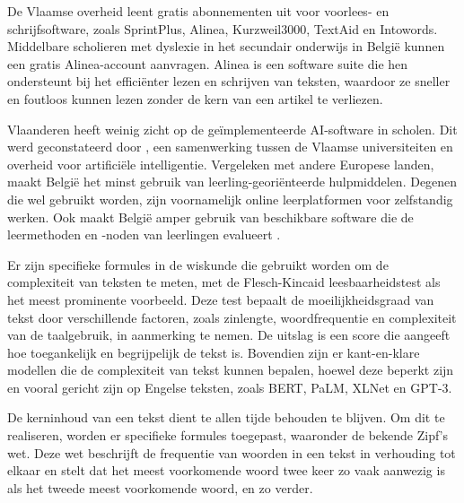 De Vlaamse overheid leent gratis abonnementen uit voor voorlees- en schrijfsoftware, zoals SprintPlus, Alinea, Kurzweil3000, TextAid en Intowords. Middelbare scholieren met dyslexie in het secundair onderwijs in België kunnen een gratis Alinea-account aanvragen. Alinea is een software suite die hen ondersteunt bij het efficiënter lezen en schrijven van teksten, waardoor ze sneller en foutloos kunnen lezen zonder de kern van een artikel te verliezen. 

Vlaanderen heeft weinig zicht op de geïmplementeerde AI-software in scholen. Dit werd geconstateerd door \autocite{Martens2021}, een samenwerking tussen de Vlaamse universiteiten en overheid voor artificiële intelligentie. Vergeleken met andere Europese landen, maakt België het minst gebruik van leerling-georiënteerde hulpmiddelen. Degenen die wel gebruikt worden, zijn voornamelijk online leerplatformen voor zelfstandig werken. Ook maakt België amper gebruik van beschikbare software die de leermethoden en -noden van leerlingen evalueert \autocite{Martens2021a}. 




Er zijn specifieke formules in de wiskunde die gebruikt worden om de complexiteit van teksten te meten, met de Flesch-Kincaid leesbaarheidstest als het meest prominente voorbeeld. Deze test bepaalt de moeilijkheidsgraad van tekst door verschillende factoren, zoals zinlengte, woordfrequentie en complexiteit van de taalgebruik, in aanmerking te nemen. De uitslag is een score die aangeeft hoe toegankelijk en begrijpelijk de tekst is. Bovendien zijn er kant-en-klare modellen die de complexiteit van tekst kunnen bepalen, hoewel deze beperkt zijn en vooral gericht zijn op Engelse teksten, zoals BERT, PaLM, XLNet en GPT-3.

De kerninhoud van een tekst dient te allen tijde behouden te blijven. Om dit te realiseren, worden er specifieke formules toegepast, waaronder de bekende Zipf's wet. Deze wet beschrijft de frequentie van woorden in een tekst in verhouding tot elkaar en stelt dat het meest voorkomende woord twee keer zo vaak aanwezig is als het tweede meest voorkomende woord, en zo verder.


